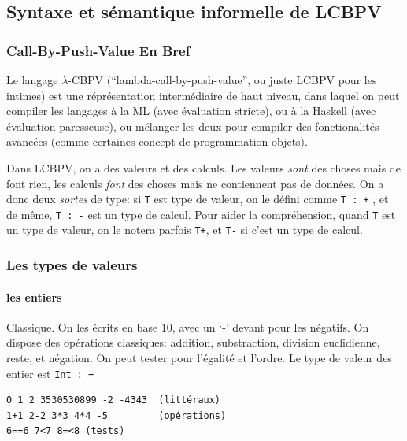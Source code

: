 \documentclass[12pt]{article}
\begin{document}
\hypertarget{syntaxe-et-suxe9mantique-informelle-de-ux3bb-cbpv}{%
      \subsection*{Syntaxe et sémantique informelle de
            LCBPV}\label{syntaxe-et-suxe9mantique-informelle-de-ux3bb-cbpv}}

\hypertarget{call-by-push-value-en-bref}{%
      \subsubsection*{Call-By-Push-Value En
            Bref}\label{call-by-push-value-en-bref}}

Le langage $\lambda$-CBPV (``lambda-call-by-push-value'', ou juste LCBPV pour
les intimes) est une réprésentation intermédiaire de haut niveau, dans
laquel on peut compiler les langages à la ML (avec évaluation stricte),
ou à la Haskell (avec évaluation paresseuse), ou mélanger les deux pour
compiler des fonctionalités avancées (comme certaines concept de
programmation objets).

Dans LCBPV, on a des valeurs et des calculs. Les valeurs \emph{sont} des
choses mais de font rien, les calculs \emph{font} des choses mais ne
contiennent pas de données. On a donc deux \emph{sortes} de type: si
\texttt{T} est type de valeur, on le défini comme \texttt{T\ :\ +} , et
de même, \texttt{T\ :\ -} est un type de calcul. Pour aider la
compréhension, quand \texttt{T} est un type de valeur, on le notera
parfois \texttt{T+}, et \texttt{T-} si c'est un type de calcul.

\hypertarget{les-types-de-valeurs}{%
      \subsubsection*{Les types de valeurs}\label{les-types-de-valeurs}}

\hypertarget{les-entiers}{%
      \paragraph*{les entiers}\label{les-entiers}}

Classique. On les écrits en base 10, avec un `-' devant pour les
négatifs. On dispose des opérations classiques: addition, substraction,
division euclidienne, reste, et négation. On peut tester pour l'égalité
et l'ordre. Le type de valeur des entier est \texttt{Int\ :\ +}

\begin{verbatim}
0 1 2 3530530899 -2 -4343  (littéraux)
1+1 2-2 3*3 4*4 -5         (opérations)
6==6 7<7 8=<8 (tests)
\end{verbatim}
\end{document}
